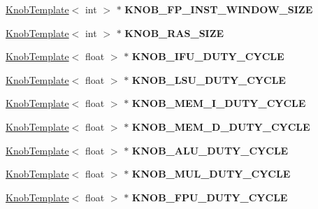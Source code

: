 \begin{DoxyCompactItemize}
\item 
\hypertarget{classall__knobs__c_ae03e40256413710d12d497abe45238c3}{
\hyperlink{classKnobTemplate}{KnobTemplate}$<$ int $>$ $\ast$ {\bfseries KNOB\_\-FP\_\-INST\_\-WINDOW\_\-SIZE}}
\label{classall__knobs__c_ae03e40256413710d12d497abe45238c3}

\item 
\hypertarget{classall__knobs__c_a6a3f8de64d94f09fa471deb4ae5c578e}{
\hyperlink{classKnobTemplate}{KnobTemplate}$<$ int $>$ $\ast$ {\bfseries KNOB\_\-RAS\_\-SIZE}}
\label{classall__knobs__c_a6a3f8de64d94f09fa471deb4ae5c578e}

\item 
\hypertarget{classall__knobs__c_a5b529fc87ff3e3bffcb4e9c1a33c9ffa}{
\hyperlink{classKnobTemplate}{KnobTemplate}$<$ float $>$ $\ast$ {\bfseries KNOB\_\-IFU\_\-DUTY\_\-CYCLE}}
\label{classall__knobs__c_a5b529fc87ff3e3bffcb4e9c1a33c9ffa}

\item 
\hypertarget{classall__knobs__c_a8b1af14d7472382fb02c47e64555b6c4}{
\hyperlink{classKnobTemplate}{KnobTemplate}$<$ float $>$ $\ast$ {\bfseries KNOB\_\-LSU\_\-DUTY\_\-CYCLE}}
\label{classall__knobs__c_a8b1af14d7472382fb02c47e64555b6c4}

\item 
\hypertarget{classall__knobs__c_ac49182c00c5304119ff661f4f34e26ef}{
\hyperlink{classKnobTemplate}{KnobTemplate}$<$ float $>$ $\ast$ {\bfseries KNOB\_\-MEM\_\-I\_\-DUTY\_\-CYCLE}}
\label{classall__knobs__c_ac49182c00c5304119ff661f4f34e26ef}

\item 
\hypertarget{classall__knobs__c_aea8ff9abf244f0b729e9ab2fc265e801}{
\hyperlink{classKnobTemplate}{KnobTemplate}$<$ float $>$ $\ast$ {\bfseries KNOB\_\-MEM\_\-D\_\-DUTY\_\-CYCLE}}
\label{classall__knobs__c_aea8ff9abf244f0b729e9ab2fc265e801}

\item 
\hypertarget{classall__knobs__c_a8229e77aa55cef1e3647c39b219f7390}{
\hyperlink{classKnobTemplate}{KnobTemplate}$<$ float $>$ $\ast$ {\bfseries KNOB\_\-ALU\_\-DUTY\_\-CYCLE}}
\label{classall__knobs__c_a8229e77aa55cef1e3647c39b219f7390}

\item 
\hypertarget{classall__knobs__c_a465a73a4b19d9386c37236eb3534c98e}{
\hyperlink{classKnobTemplate}{KnobTemplate}$<$ float $>$ $\ast$ {\bfseries KNOB\_\-MUL\_\-DUTY\_\-CYCLE}}
\label{classall__knobs__c_a465a73a4b19d9386c37236eb3534c98e}

\item 
\hypertarget{classall__knobs__c_aa5c5b6644befb65293c461e61b5e18f6}{
\hyperlink{classKnobTemplate}{KnobTemplate}$<$ float $>$ $\ast$ {\bfseries KNOB\_\-FPU\_\-DUTY\_\-CYCLE}}
\label{classall__knobs__c_aa5c5b6644befb65293c461e61b5e18f6}


\end{DoxyCompactItemize}
